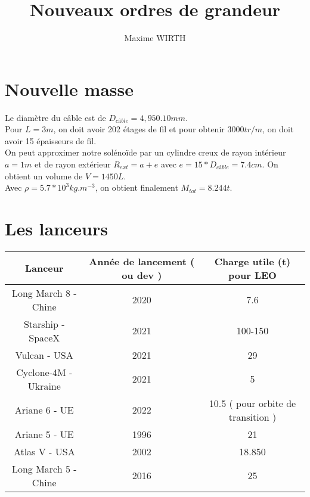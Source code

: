 \documentclass[a4paper]{article}
\author{Maxime WIRTH}
\title{Nouveaux ordres de grandeur}
\begin{document}
\maketitle

\section{Nouvelle masse}
Le diamètre du câble est de $D_{câble} = 4,950.10 mm$.\\
Pour $L = 3m$, on doit avoir 202 étages de fil et pour obtenir $3000 tr/m$, on doit avoir 15 épaisseurs de fil.\\
On peut approximer notre solénoïde par un cylindre creux de rayon intérieur $a = 1m$ et de rayon extérieur $R_{ext} = a + e$ avec $e = 15 * D_{câble} = 7.4 cm$.
On obtient un volume de $V = 1450 L$.\\
Avec $\rho = 5.7 * 10^{3} kg.m^{-3}$, on obtient finalement $M_{tot} = 8.244 t$.

\section{Les lanceurs}

\begin{tabular}{|c|c|c|}
    \hline
    Lanceur & Année de lancement ( ou dev ) & Charge utile (t) pour LEO \\
    \hline
    Long March 8 - Chine & 2020 & 7.6 \\
    \hline
    Starship - SpaceX & 2021 & 100-150 \\
    \hline
    Vulcan - USA & 2021 & 29 \\
    \hline
    Cyclone-4M - Ukraine & 2021 & 5 \\
    \hline
    Ariane 6 - UE & 2022 & 10.5 ( pour orbite de transition ) \\
    \hline
    Ariane 5 - UE & 1996 & 21 \\
    \hline
    Atlas V - USA & 2002 & 18.850 \\
    \hline
    Long March 5 - Chine & 2016 & 25 \\
    \hline
    
\end{tabular}
\end{document}
